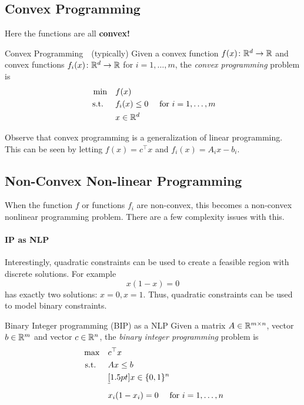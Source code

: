 \subsection{Convex Programming}
Here the functions are all \textbf{convex!}
\begin{general}{Convex Programming}{\polynomial\ \  (typically)}
Given a convex function $f(x)\colon \mathbb{R}^d \to \mathbb{R}$ and convex functions $f_i(x)\colon \mathbb{R}^d \to \mathbb{R}$ for $i=1, \dots, m$,  the \emph{convex programming} problem is
\begin{equation}
\label{eq:convex-programming}
\begin{split}
\min \quad & f(x)\\
\text{ s.t. }  \quad & f_i(x) \leq 0  \quad  \text{ for } i=1, \dots, m\\
& x \in \mathbb{R}^d
\end{split}
\end{equation}
\end{general}

Observe that convex programming is a generalization of linear programming.  This can be seen by letting $f(x) = c^\top x$ and $f_i(x) = A_i x - b_i$.  

\subsection{Non-Convex Non-linear Programming}

When the function $f$ or functions $f_i$ are non-convex, this becomes a non-convex nonlinear programming problem.  There are a few complexity issues with this.

\paragraph{IP as NLP}
Interestingly, quadratic constraints can be used to create a feasible region with discrete solutions.  For example 
$$
x(1-x) = 0
$$
has exactly two solutions: $x = 0, x=1$.  
Thus, quadratic constraints can be used to model binary constraints.
\begin{general}{Binary Integer programming (BIP) as a NLP}{\nphard}
Given a matrix $A \in \mathbb{R}^{m\times n}$, vector $b \in \mathbb{R}^m$ and vector $c \in \mathbb{R}^n$, the \emph{binary integer programming} problem is
\begin{equation}
\label{eq:BIP-NLP}
\begin{split}
\max \quad & c^\top x\\
\st  \quad & Ax \leq b\\
& \hcancel[1.5pt]{x \in \{0,1\}^n}\\
& x_i(1-x_i) = 0 \quad \text{ for } i=1, \dots, n
\end{split}
\end{equation}
\end{general}

